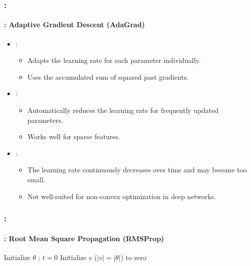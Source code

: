 \documentclass[xcolor=table]{beamer}
\begin{document}
\begin{frame}
	\frametitle{\insertshortsubtitle: \insertsection}
	\framesubtitle{\insertsubsection: Adaptive Gradient Descent (AdaGrad)}
	
	\begin{itemize}
		\item {}: 
		\begin{itemize}
			\item Adapts the learning rate for each parameter individually.
			\item Uses the accumulated sum of squared past gradients.
		\end{itemize}
		
		\item {}: 
		\begin{itemize}
			\item Automatically reduces the learning rate for frequently updated parameters.
			\item Works well for sparse features.
		\end{itemize}
		
		\item {}: 
		\begin{itemize}
			\item The learning rate continuously decreases over time and may become too small.
			\item Not well-suited for non-convex optimization in deep networks.
		\end{itemize}
	\end{itemize}
	
\end{frame}


\begin{frame}
	\frametitle{\insertshortsubtitle: \insertsection}
	\framesubtitle{\insertsubsection: Root Mean Square Propagation (RMSProp)}
	
	\begin{algorithm}[H]
		\KwResult{$ \theta $}
		Initialize $ \theta $ ; $ t = 0 $\;
		Initialize $ v $ ($|v| = |\theta|$) to zero\;
		\caption{RMSProp}
	\end{algorithm}
	
\end{frame}
\end{document}

